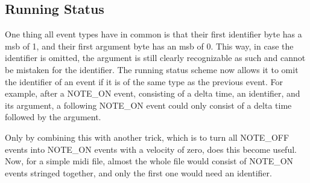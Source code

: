\subsection{Running Status}

One thing all event types have in common is that their first identifier byte has a \gls{msb} of 1, and their first argument byte has an \gls{msb} of 0. This way, in case the identifier is omitted, the argument is still clearly recognizable as such and cannot be mistaken for the identifier. The running status scheme now allows it to omit the identifier of an event if it is of the same type as the previous event. For example, after a \newline NOTE\_ON event, consisting of a delta time, an identifier, and its argument, a following NOTE\_ON event could only consist of a delta time followed by the argument.

Only by combining this with another trick, which is to turn all NOTE\_OFF events into NOTE\_ON events with a velocity of zero, does this become useful. Now, for a simple \gls{midi} file, almost the whole file would consist of NOTE\_ON events stringed together, and only the first one would need an identifier.

